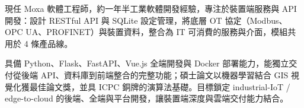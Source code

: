 

\begin{cvparagraph}

現任 Moxa 軟體工程師，約一年半工業軟體開發經驗，專注於裝置端服務與 API 開發：設計 RESTful API 與 SQLite 設定管理，將底層 OT 協定（Modbus、OPC UA、PROFINET）與裝置資料，整合為 IT 可消費的服務與介面，模組共用於 4 條產品線。

具備 Python、Flask、FastAPI、Vue.js 全端開發與 Docker 部署能力，能獨立交付從後端 API、資料庫到前端整合的完整功能；碩士論文以機器學習結合 GIS 視覺化獲最佳論文獎，並具 ICPC 銅牌的演算法基礎。目標鎖定 industrial-IoT / edge-to-cloud 的後端、全端與平台開發，讓裝置端深度與雲端交付能力結合。
\end{cvparagraph}
